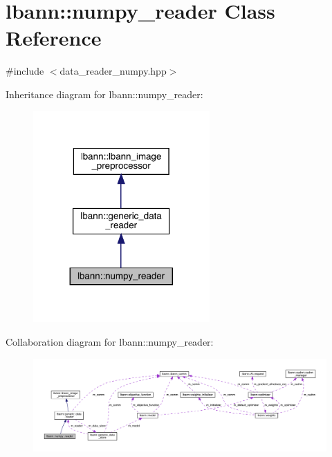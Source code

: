 \hypertarget{classlbann_1_1numpy__reader}{}\section{lbann\+:\+:numpy\+\_\+reader Class Reference}
\label{classlbann_1_1numpy__reader}


{\ttfamily \#include $<$data\+\_\+reader\+\_\+numpy.\+hpp$>$}



Inheritance diagram for lbann\+:\+:numpy\+\_\+reader\+:\nopagebreak
\begin{figure}[H]
\begin{center}
\leavevmode
\includegraphics[width=191pt]{classlbann_1_1numpy__reader__inherit__graph}
\end{center}
\end{figure}


Collaboration diagram for lbann\+:\+:numpy\+\_\+reader\+:\nopagebreak
\begin{figure}[H]
\begin{center}
\leavevmode
\includegraphics[width=350pt]{classlbann_1_1numpy__reader__coll__graph}
\end{center}
\end{figure}

